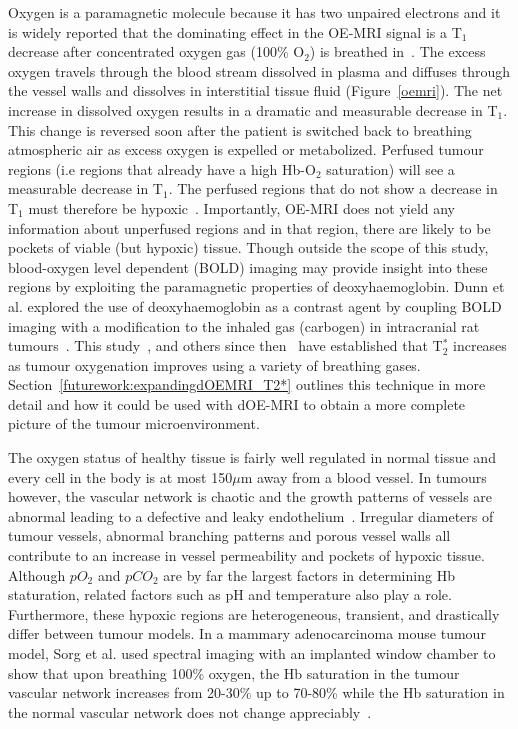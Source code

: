 Oxygen is a paramagnetic molecule because it has two unpaired electrons and it is widely reported that the dominating effect in the OE-MRI signal is a T$_1$ decrease after concentrated oxygen gas (100\% O$_2$) is breathed in~\cite{OConnor:2016ee,Linnik:2013hf}. 
The excess oxygen travels through the blood stream dissolved in plasma and diffuses through the vessel walls and dissolves in interstitial tissue fluid (Figure~\ref{oemri}).
The net increase in dissolved oxygen results in a dramatic and measurable decrease in T$_1$. 
This change is reversed soon after the patient is switched back to breathing atmospheric air as excess oxygen is expelled or metabolized. 
Perfused tumour regions (i.e regions that already have a high \acs{Hb}-O$_2$ saturation) will see a measurable decrease in T$_1$. 
The perfused regions that do not show a decrease in T$_1$ must therefore be hypoxic~\cite{OConnor:2016ee}. 
Importantly, \acs{OE-MRI} does not yield any information about unperfused regions and in that region, there are likely to be pockets of viable (but hypoxic) tissue.
Though outside the scope of this study, blood-oxygen level dependent (\acs{BOLD}) imaging may provide insight into these regions by exploiting the paramagnetic properties of deoxyhaemoglobin. 
Dunn et al. explored the use of deoxyhaemoglobin as a contrast agent by coupling \acs{BOLD} imaging with a modification to the inhaled gas (carbogen) in intracranial rat tumours~\cite{Dunn:2002ji}.
This study~\cite{Dunn:2002ji}, and others since then~\cite{Little:2018iu,Yang:2019cz,Hallac:2014cb,Zhao:2015ez} have established that T$_2^*$ increases as tumour oxygenation improves using a variety of breathing gases.
Section~\ref{futurework:expandingdOEMRI_T2*} outlines this technique in more detail and how it could be used with \acs{dOE-MRI} to obtain a more complete picture of the tumour microenvironment.

The oxygen status of healthy tissue is fairly well regulated in normal tissue and every cell in the body is at most 150$\mu$m away from a blood vessel. 
In tumours however, the vascular network is chaotic and the growth patterns of vessels are abnormal leading to a defective and leaky endothelium~\cite{McDonald:2002ut}. 
Irregular diameters of tumour vessels, abnormal branching patterns and porous vessel walls all contribute to an increase in vessel permeability and pockets of hypoxic tissue. 
Although $pO_2$ and $pCO_2$ are by far the largest factors in determining Hb staturation, related factors such as pH and temperature also play a role.
Furthermore, these hypoxic regions are heterogeneous, transient, and drastically differ between tumour models. 
In a mammary adenocarcinoma mouse tumour model, Sorg et al. used spectral imaging with an implanted window chamber to show that upon breathing 100\% oxygen, the \acs{Hb} saturation in the tumour vascular network increases from 20-30\% up to 70-80\% while the \acs{Hb} saturation in the normal vascular network does not change appreciably~\cite{Sorg:2008eg}.

